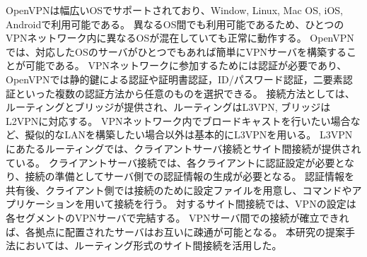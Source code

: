 OpenVPNは幅広いOSでサポートされており、Window, Linux, Mac OS, iOS, Androidで利用可能である。
異なるOS間でも利用可能であるため、ひとつのVPNネットワーク内に異なるOSが混在していても正常に動作する。
OpenVPNでは、対応したOSのサーバがひとつでもあれば簡単にVPNサーバを構築することが可能である。
VPNネットワークに参加するためには認証が必要であり、OpenVPNでは静的鍵による認証や証明書認証，ID/パスワード認証，二要素認証といった複数の認証方法から任意のものを選択できる。
接続方法としては、ルーティングとブリッジが提供され、ルーティングはL3VPN, ブリッジはL2VPNに対応する。
VPNネットワーク内でブロードキャストを行いたい場合など、擬似的なLANを構築したい場合以外は基本的にL3VPNを用いる。
L3VPNにあたるルーティングでは、クライアントサーバ接続とサイト間接続が提供されている。
クライアントサーバ接続では、各クライアントに認証設定が必要となり、接続の準備としてサーバ側での認証情報の生成が必要となる。
認証情報を共有後、クライアント側では接続のために設定ファイルを用意し、コマンドやアプリケーションを用いて接続を行う。
対するサイト間接続では、VPNの設定は各セグメントのVPNサーバで完結する。
VPNサーバ間での接続が確立できれば、各拠点に配置されたサーバはお互いに疎通が可能となる。
本研究の提案手法においては、ルーティング形式のサイト間接続を活用した。